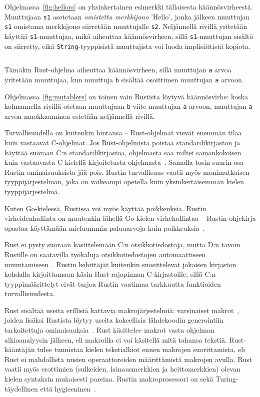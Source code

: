 Ohjelmassa~\ref{fig:hellors} on yksinkertainen esimerkki tällaisesta
käännösvirheestä. Muuttujaan \texttt{s1} asetetaan \emph{omistettu merkkijono}
'Hello', jonka jälkeen muuttujan \texttt{s1} omistama merkkijono siirretään
muuttujalle \texttt{s2}. Neljännellä rivillä yritetään käyttää
\texttt{s1}-muuttujaa, mikä aiheuttaa käännösvirheen, sillä
\texttt{s1}-muuttujan sisältö on siirretty, eikä \texttt{String}-tyyppisistä
muuttujista voi luoda implisiittistä kopiota.

\begin{listing}[ht!]
    \inputminted{Rust}{koodi/mutable.rs}
    \caption{Tämäkin Rust-ohjelma aiheuttaa käännösvirheen, sillä muuttujan
    \texttt{a} arvoa yritetään muuttujaa, kun muuttuja \texttt{b} sisältää
    osoittimen muuttujan \texttt{a} arvoon.}
    \label{fig:mutablers}
\end{listing}

Ohjelmassa~\ref{fig:mutablers} on toinen vain Rustista löytyvä käännösvirhe:
koska kolmannella rivillä otetaan muuttujaan \texttt{b} viite muuttujan
\texttt{a} arvoon, muuttujan \texttt{a} arvon muokkaaminen estetään neljännellä
rivillä.

Turvallisuudella on kuitenkin hintansa -- Rust-ohjelmat vievät enemmän tilaa
kuin vastaavat C-ohjelmat. Jos Rust-ohjelmista poistaa standardikirjaston ja
käyttää suoraan C:n standardikirjastoa, ohjelmasta saa miltei samankokoisen
kuin vastaavasta C-kielellä kirjoitetusta ohjelmasta~\citep{rustbinarysize}.
Samalla tosin suurin osa Rustin ominaisuuksista jää pois. Rustin turvallisuus
vaatii myös monimutkaisen tyyppijärjestelmän, joka on vaikeampi opetella kuin
yksinkertaisemman kielen tyyppijärjestelmä.

Kuten Go-kielessä, Rustissa voi myös käyttää poikkeuksia. Rustin
virheidenhallinta on muutenkin lähellä Go-kielen virhehallintaa -- Rustin
ohjekirja opastaa käyttämään mieluummin paluuarvoja kuin
poikkeuksia~\citep{rusterrorhandling}.

Rust ei pysty suoraan käsittelemään C:n otsikkotiedostoja, mutta D:n tavoin
Rustille on saatavilla työkaluja otsikkotiedostojen automaattiseen
muuntamiseen~\citep{rustbindgen}. Rustin kehittäjät kuitenkin suosittelevat
jokaisen kirjaston kohdalla kirjoittamaan käsin Rust-rajapinnan C-kirjastoille,
sillä C:n tyyppimäärittelyt eivät tarjoa Rustin vaatimaa tarkkuutta funktioiden
turvallisuudesta.

Rust sisältää useita erillisiä kattavia makrojärjestelmiä:
varsinaiset makrot~\citep{rustmacros}, joiden lisäksi Rustista löytyy useita
kokeellisia lähdekoodin generointiin tarkoitettuja
ominaisuuksia~\citep{rustprocmacros, rustplugins}. Rust käsittelee makrot vasta
ohjelman alkioanalyysin jälkeen, eli makroilla ei voi käsitellä mitä tahansa
tekstiä. Rust-kääntäjän tulee tunnistaa kielen tekstialkiot ennen makrojen
suorittamista, eli Rust ei mahdollista uusien operaattoreiden määrittämistä
makrojen avulla. Rust vaatii myös erottimien (sulkeiden, lainausmerkkien ja
heittomerkkien) olevan kielen syntaksin mukaisesti pareina. Rustin
makroprosessori on sekä Turing-täydellinen että hygieeninen~\citep{rustmacros}.

